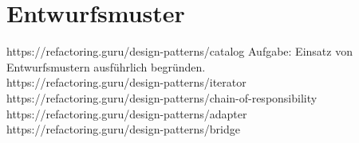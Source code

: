 \chapter{Entwurfsmuster}
https://refactoring.guru/design-patterns/catalog
Aufgabe: Einsatz von Entwurfsmustern ausführlich begründen.\\

https://refactoring.guru/design-patterns/iterator\\
https://refactoring.guru/design-patterns/chain-of-responsibility\\
https://refactoring.guru/design-patterns/adapter\\
https://refactoring.guru/design-patterns/bridge


